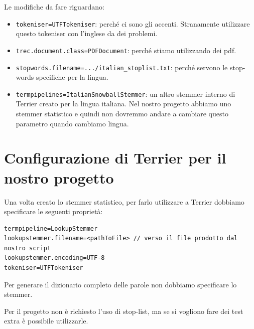Le modifiche da fare riguardano:

\begin{itemize}
	\item \texttt{tokeniser=UTFTokeniser}: perché ci sono gli accenti. Stranamente utilizzare questo tokeniser con l'inglese da dei problemi.
	\item \texttt{trec.document.class=PDFDocument}: perché stiamo utilizzando dei pdf.
	\item \texttt{stopwords.filename=.../italian\_stoplist.txt}: perché servono le stop-words specifiche per la lingua.
	\item \texttt{termpipelines=ItalianSnowballStemmer}: un altro stemmer interno di Terrier creato per la lingua italiana. Nel nostro progetto abbiamo uno stemmer statistico e quindi non dovremmo andare a cambiare questo parametro quando cambiamo lingua.
\end{itemize}

\section{Configurazione di Terrier per il nostro progetto}

Una volta creato lo stemmer statistico, per farlo utilizzare a Terrier dobbiamo specificare le seguenti proprietà:

\begin{lstlisting}
termpipeline=LookupStemmer
lookupstemmer.filename=<pathToFile> // verso il file prodotto dal nostro script
lookupstemmer.encoding=UTF-8
tokeniser=UTFTokeniser
\end{lstlisting}

\noindent Per generare il dizionario completo delle parole non dobbiamo specificare lo stemmer.

Per il progetto non è richiesto l'uso di stop-list, ma se si vogliono fare dei test extra è possibile utilizzarle.



